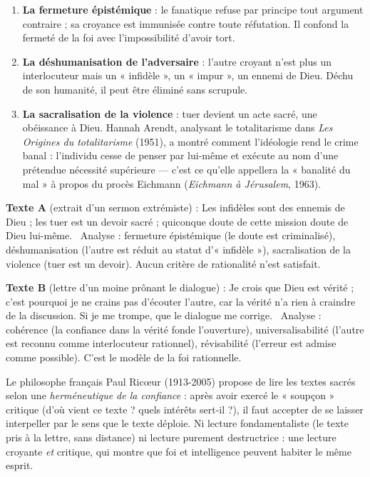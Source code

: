 \documentclass[11pt]{article}
\begin{document}
\begin{enumerate}
\item \textbf{La fermeture épistémique} : le fanatique refuse par principe tout argument contraire ; sa croyance est immunisée contre toute réfutation. Il confond la fermeté de la foi avec l'impossibilité d'avoir tort.
\item \textbf{La déshumanisation de l'adversaire} : l'autre croyant n'est plus un interlocuteur mais un « infidèle », un « impur », un ennemi de Dieu. Déchu de son humanité, il peut être éliminé sans scrupule.
\item \textbf{La sacralisation de la violence} : tuer devient un acte sacré, une obéissance à Dieu. Hannah Arendt, analysant le totalitarisme dans \emph{Les Origines du totalitarisme} (1951), a montré comment l'idéologie rend le crime banal : l'individu cesse de penser par lui-même et exécute au nom d'une prétendue nécessité supérieure — c'est ce qu'elle appellera la « banalité du mal » à propos du procès Eichmann (\emph{Eichmann à Jérusalem}, 1963).
\end{enumerate}

\begin{exemplebox}
\textbf{Texte A} (extrait d'un sermon extrémiste) : \guillemotleft Les infidèles sont des ennemis de Dieu ; les tuer est un devoir sacré ; quiconque doute de cette mission doute de Dieu lui-même. \guillemotright\ Analyse : fermeture épistémique (le doute est criminalisé), déshumanisation (l'autre est réduit au statut d'« infidèle »), sacralisation de la violence (tuer est un devoir). Aucun critère de rationalité n'est satisfait.

\textbf{Texte B} (lettre d'un moine prônant le dialogue) : \guillemotleft Je crois que Dieu est vérité ; c'est pourquoi je ne crains pas d'écouter l'autre, car la vérité n'a rien à craindre de la discussion. Si je me trompe, que le dialogue me corrige. \guillemotright\ Analyse : cohérence (la confiance dans la vérité fonde l'ouverture), universalisabilité (l'autre est reconnu comme interlocuteur rationnel), révisabilité (l'erreur est admise comme possible). C'est le modèle de la foi rationnelle.
\end{exemplebox}

\begin{savaistu}
Le philosophe français Paul Ricœur (1913-2005) propose de lire les textes sacrés selon une \emph{herméneutique de la confiance} : après avoir exercé le « soupçon » critique (d'où vient ce texte ? quels intérêts sert-il ?), il faut accepter de se laisser interpeller par le sens que le texte déploie. Ni lecture fondamentaliste (le texte pris à la lettre, sans distance) ni lecture purement destructrice : une lecture croyante \emph{et} critique, qui montre que foi et intelligence peuvent habiter le même esprit.
\end{savaistu}
\end{document}
